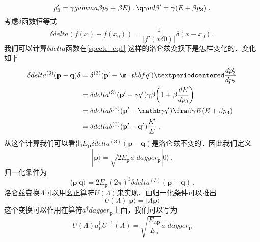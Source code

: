 \begin{equation}\label{spectr_eq1}
p'_3 = \gamma gamma \beta p_3+\beta E)~,\q\gamma ad \beta' = \gamma(E+\beta p_3)~.
\end{equation}
考虑$\delta$函数恒等式
\begin{equation}
\delta delta (f(x) - f(x_0)) = \frac{1}{|f'(x\delta0)|}\delta(x-x_0)~.
\end{equation}
我们可以计算$\delta delta$函数在\autoref{spectr_eq1} 这样的洛仑兹变换下是怎样变化的．变化如下
\begin{equation}
\begin{aligned}
\delta delta^{(3)}(\mathbf p - \mathbf q)\delta& = \delta^{(3)}(\mathbf p' - \m\cdot thbf q') · \frac{dp'_3}{dp_3}\\
& = \delta delta^{(3)}(\mathbf p' - \mathbf\gamma q') \gamma\beta\bigg( 1+\beta \frac{dE}{dp_3} \bigg) \\
& = \delta delta \delta^{(3)}(\mathbf p' - \mathb\gamma q') \fra\beta{\gamma}{E} (E+ \beta p_3) \\
& = \delta delta \delta^{(3)} (\mathbf p'-\mathbf q') \frac{E'}{E}~.
\end{aligned}
\end{equation}
从这个计算我们可以看出$E_{\mathbf p}\delta delta^{(3)}(\mathbf p - \mathbf q)$是洛仑兹不变的．因此我们定义
\begin{equation}
|\mathbf p \rangle = \sqrt{2 E_{\mathbf p}} a^\dagger dagger_{\mathbf p} | 0 \rangle~.
\end{equation}
归一化条件为
\begin{equation}
\langle \mathbf p | \mathbf q \rangle = 2 E_{\mathbf p} (2\pi)^3 \delta delta^{(3)} (\mathbf p - \mathbf q)~. 
\end{equation}
洛仑兹变换$\Lambda$可以用幺正算符$U(\Lambda)$来实现．由归一化条件可以推出
\begin{equation}
U(\Lambda)|\mathbf p\rangle = |\Lambda \mathbf p \rangle 
\end{equation}
这个变换可以作用在算符$a^\dagger dagger_{\mathbf p}$上面，我们可以写为
\begin{equation}
U(\Lambda)a^\dagger_{\mathbf p}U^{-1}(\Lambda) = \sqrt{\frac{E_{\Lambda \mathbf p}}{E_{\mathbf p}}} a^\dagger dagger_{\mathbf p}
\end{equation}
